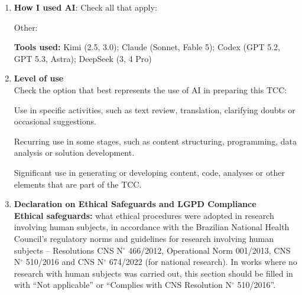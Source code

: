\begin{enumerate}
\item \textbf{How I used AI}: Check all that apply:

\vspace{0.32cm}
\vspace{0.24cm}
\vspace{0.24cm}
\vspace{0.24cm}
\vspace{0.24cm}
\vspace{0.24cm}
\vspace{0.24cm}
\noindent\checkbox\hspace{0.12cm}Other: \formline{10.95cm}

\vspace{0.42cm}
\textbf{Tools used:} Kimi (2.5, 3.0); Claude (Sonnet, Fable 5); Codex (GPT 5.2, GPT 5.3, Astra); DeepSeek (3, 4 Pro)

\vspace{0.48cm}
\formline{15.25cm}

\vspace*{0.45cm}

\item \textbf{Level of use}\\
\noindent Check the option that best represents the use of AI in preparing this TCC:

\vspace{0.38cm}
Use in specific activities, such as text review, translation, clarifying doubts or occasional suggestions.

\vspace{0.38cm}
Recurring use in some stages, such as content structuring, programming, data analysis or solution development.

\vspace{0.38cm}
Significant use in generating or developing content, code, analyses or other elements that are part of the TCC.

\vspace{0.72cm}
\item \textbf{Declaration on Ethical Safeguards and LGPD Compliance}\\
\textbf{Ethical safeguards:} what ethical procedures were adopted in research involving human subjects, in accordance with the Brazilian National Health Council's regulatory norms and guidelines for research involving human subjects -- Resolutions CNS N$^\circ$ 466/2012, Operational Norm 001/2013, CNS N$^\circ$ 510/2016 and CNS N$^\circ$ 674/2022 (for national research). In works where no research with human subjects was carried out, this section should be filled in with ``Not applicable'' or ``Complies with CNS Resolution N$^\circ$ 510/2016''.


\end{enumerate}

